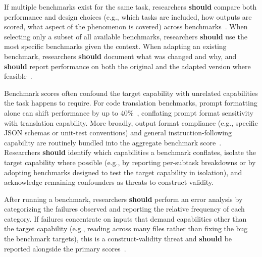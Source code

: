 \documentclass[smallextended]{svjour3}
\newcommand{\should}{\textbf{should}\xspace}
\begin{document}
If multiple benchmarks exist for the same task, researchers \should compare both performance and design choices (e.g., which tasks are included, how outputs are scored, what aspect of the phenomenon is covered) across benchmarks~\cite{bean2025measuring}.
When selecting only a subset of all available benchmarks, researchers \should use the most specific benchmarks given the context.
When adapting an existing benchmark, researchers \should document what was changed and why, and \should report performance on both the original and the adapted version where feasible~\cite{bean2025measuring}.

Benchmark scores often confound the target capability with unrelated capabilities the task happens to require. For code translation benchmarks, prompt formatting alone can shift performance by up to 40\%~\cite{DBLP:journals/corr/abs-2411-10541, cao2025should}, conflating prompt format sensitivity with translation capability. More broadly, output format compliance (e.g., specific JSON schemas or unit-test conventions) and general instruction-following capability are routinely bundled into the aggregate benchmark score~\cite{bean2025measuring}. Researchers \should identify which capabilities a benchmark conflates, isolate the target capability where possible (e.g., by reporting per-subtask breakdowns or by adopting benchmarks designed to test the target capability in isolation), and acknowledge remaining confounders as threats to construct validity.

After running a benchmark, researchers \should perform an error analysis by categorizing the failures observed and reporting the relative frequency of each category. If failures concentrate on inputs that demand capabilities other than the target capability (e.g., reading across many files rather than fixing the bug the benchmark targets), this is a construct-validity threat and \should be reported alongside the primary scores~\cite{bean2025measuring}.
\end{document}
